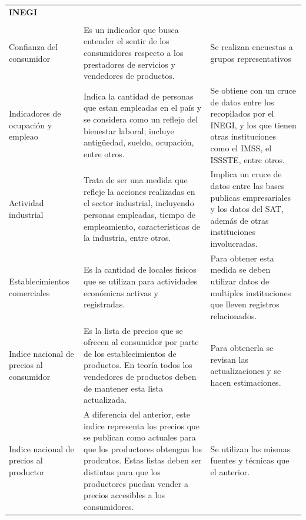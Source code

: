 \documentclass[12pt]{article}
\begin{document}
\begin{longtable}{|p{3cm}|p{7cm} p{4cm}|}
	\bf INEGI \\ & & \\
	Confianza del consumidor & Es un indicador que busca entender el sentir de los consumidores respecto a los prestadores de servicios y vendedores de productos. & Se realizan encuestas a grupos representativos \\
	Indicadores de ocupaci\'on y empleao & Indica la cantidad de personas que estan empleadas en el pa\'is y se considera como un reflejo del bienestar laboral; incluye antigüedad, sueldo, ocupaci\'on, entre otros. & Se obtiene con un cruce de datos entre los recopilados por el INEGI, y los que tienen otras instituciones como el IMSS, el ISSSTE, entre otros. \\
	Actividad industrial & Trata de ser una medida que refleje la acciones realizadas en el sector industrial, incluyendo personas empleadas, tiempo de empleamiento, caracter\'isticas de la industria, entre otros. & Implica un cruce de datos entre las bases publicas empresariales y los datos del SAT, adem\'as de otras instituciones involucradas. \\
	Establecimientos comerciales & Es la cantidad de locales fisicos que se utilizan para actividades econ\'omicas activas y registradas.  & Para obtener esta medida se deben utilizar datos de multiples instituciones que lleven registros relacionados. \\
	Indice nacional de precios al consumidor & Es la lista de precios que se ofrecen al consumidor por parte de los establecimientos de productos. En teor\'ia todos los vendedores de productos deben de mantener esta lista actualizada. & Para obtenerla se revisan las actualizaciones y se hacen estimaciones. \\
	Indice nacional de precios al productor & A diferencia del anterior, este indice representa los precios que se publican como actuales para que los productores obtengan los prodcutos. Estas listas deben ser distintas para que los productores puedan vender a precios accesibles a los consumidores. & Se utilizan las mismas fuentes y t\'ecnicas que el anterior. \\
	

\end{longtable}
\end{document}
